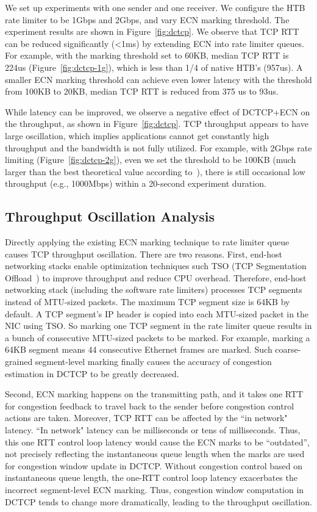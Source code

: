 We set up experiments with one sender and one receiver. We configure the HTB rate limiter to be 1Gbps and 2Gbps, 
and vary ECN marking threshold. The experiment results are shown in Figure~\ref{fig:dctcp}. 
We observe that TCP RTT can be reduced significantly (<1ms) by extending ECN into rate limiter queues. 
For example, with the marking threshold set to 60KB, median TCP RTT is 224us (Figure~\ref{fig:dctcp-1g}), 
which is less than 1/4 of native HTB's (957us). A smaller ECN marking threshold 
can achieve even lower latency \textemdash\xspace with the threshold from 100KB to 20KB, median TCP RTT is reduced from 375 us to 93us.

While latency can be improved, we observe a negative effect of DCTCP+ECN on the throughput, as shown in Figure~\ref{fig:dctcp}.
TCP throughput appears to have large oscillation, 
which implies applications cannot get constantly high throughput and the bandwidth is not fully utilized. 
For example, with 2Gbps rate limiting (Figure~\ref{fig:dctcp-2g}), 
even we set the threshold to be 100KB (much larger than the best theoretical value according to~\cite{alizadeh2010data}), 
there is still occasional low throughput (e.g., 1000Mbps) within a 20-second experiment duration.

\subsection{Throughput Oscillation Analysis}
Directly applying the existing ECN marking technique to rate limiter queue 
causes TCP throughput oscillation. There are two reasons. First, end-host networking stacks 
enable optimization techniques such TSO (TCP Segmentation Offload~\cite{tcp-segment-offload}) to 
improve throughput and reduce CPU overhead. Therefore, end-host networking stack 
(including the software rate limiters) processes TCP segments instead of MTU-sized packets. 
The maximum TCP segment size is 64KB by default. A TCP segment's IP header is copied 
into each MTU-sized packet in the NIC using TSO. So marking one TCP segment in the rate limiter queue 
results in a bunch of consecutive MTU-sized packets to be marked.
For example, marking a 64KB segment means 44 consecutive Ethernet frames are marked. 
Such coarse-grained segment-level marking finally causes the accuracy of congestion estimation in DCTCP to be greatly decreased. 

Second, ECN marking happens on the transmitting path, and it takes one RTT for 
congestion feedback to travel back to the sender before congestion control actions are taken. 
Moreover, TCP RTT can be affected by the ``in network" latency. ``In network" latency can be milliseconds or tens of milliseconds. 
Thus, this one RTT control loop latency 
would cause the ECN marks to be ``outdated'', not precisely reflecting the instantaneous queue length 
when the marks are used for congestion window update in DCTCP.
Without congestion control based on instantaneous queue length, 
the one-RTT control loop latency exacerbates the incorrect segment-level ECN marking. 
Thus, congestion window computation in DCTCP tends to change more dramatically, leading to the throughput oscillation.



